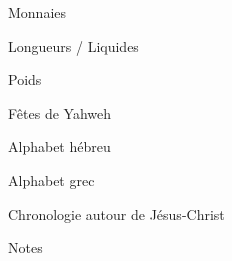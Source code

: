\documentclass[11pt]{book}
\begin{document}
\clearpage
\begin{center}Monnaies\end{center}\clearpage
\clearpage
\begin{center}Longueurs / Liquides\end{center}\clearpage
\clearpage
\begin{center}Poids\end{center}\clearpage
\clearpage
\begin{center}Fêtes de Yahweh\end{center}\clearpage
\clearpage
\begin{center}Alphabet hébreu\end{center}\clearpage
\clearpage
\begin{center}Alphabet grec\end{center}\clearpage
\clearpage
\begin{center}Chronologie autour de Jésus-Christ\end{center}\clearpage
\makeatletter
\def\@oddhead{\hfil}
\def\@evenhead{\hfil}
\def\@oddfoot{\hfil}
\def\@evenfoot{\hfil}
\makeatother
\begin{center}Notes\end{center}\clearpage
\end{document}
